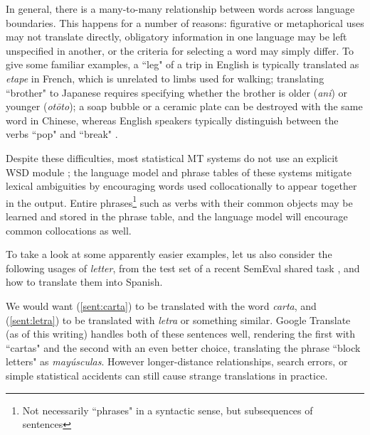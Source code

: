 In general, there is a many-to-many relationship between words across language
boundaries.
This happens for a number of reasons: figurative or metaphorical uses may not
translate directly,
obligatory information in one language may be left unspecified in another,
or the criteria for selecting a word may simply differ.
To give some familiar examples, a ``leg" of a trip in English is typically
translated as \emph{etape} in French, which is unrelated to limbs used for
walking;
translating ``brother" to Japanese requires specifying whether the brother is
older (\emph{ani}) or younger (\emph{ot\=oto});
a soap bubble or a ceramic plate can be destroyed with the same word in
Chinese, whereas English speakers typically distinguish between the verbs
``pop" and ``break" \cite{majid2007semantic}.

Despite these difficulties, most statistical MT systems do not use an explicit
WSD module \cite{wsdchap3}; the language model and phrase tables of these
systems mitigate lexical ambiguities by encouraging words used collocationally
to appear together in the output. Entire phrases\footnote{Not necessarily
``phrases" in a syntactic sense, but subsequences of sentences} such as verbs
with their common objects may be learned and stored in the phrase table, and
the language model will encourage common collocations as well.

To take a look at some apparently easier examples, let us also consider the
following usages of \emph{letter}, from the test set of a recent SemEval shared
task \cite{task10}, and how to translate them into Spanish.

\label{sent:carta}
\label{sent:letra}

We would want (\ref{sent:carta}) to be translated with the word \emph{carta},
and (\ref{sent:letra}) to be translated with \emph{letra} or something similar.
Google Translate (as of this writing) handles both of these sentences well,
rendering the first with ``cartas" and the second with an even better choice,
translating the phrase ``block letters" as \emph{mayúsculas}.
However longer-distance relationships, search errors, or simple statistical
accidents can still cause strange translations in practice.

